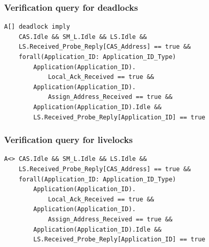\subsubsection{Verification query for deadlocks}
\lstset{language=C}
\begin{lstlisting}[frame=single]
A[] deadlock imply
    CAS.Idle && SM_L.Idle && LS.Idle &&
    LS.Received_Probe_Reply[CAS_Address] == true &&
    forall(Application_ID: Application_ID_Type)
        Application(Application_ID).
            Local_Ack_Received == true &&
        Application(Application_ID).
            Assign_Address_Received == true &&
        Application(Application_ID).Idle &&
        LS.Received_Probe_Reply[Application_ID] == true
\end{lstlisting}

\subsubsection{Verification query for livelocks}
\lstset{language=C}
\begin{lstlisting}[frame=single]
A<> CAS.Idle && SM_L.Idle && LS.Idle &&
    LS.Received_Probe_Reply[CAS_Address] == true &&
    forall(Application_ID: Application_ID_Type)
        Application(Application_ID).
            Local_Ack_Received == true &&
        Application(Application_ID).
            Assign_Address_Received == true &&
        Application(Application_ID).Idle &&
        LS.Received_Probe_Reply[Application_ID] == true
\end{lstlisting}
